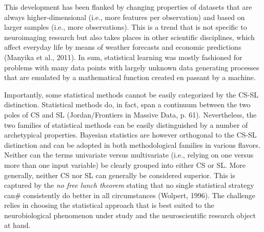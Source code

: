 \documentclass[authoryear,review,3p]{elsarticle}
\begin{document}
This development has been flanked by changing properties of datasets that
are always higher-dimensional (i.e., more features per observation)
and
based
on larger samples (i.e., more observations).
This is a trend that is not specific to
neuroimaging research but also takes places
in other scientific disciplines,
which affect everyday life by means of weather forecasts and economic predictions
(Manyika et al., 2011).
In sum,
statistical learning was mostly fashioned
for problems with many data points with largely unknown
data generating processes
that are emulated by a mathematical function
created en passant by a machine.


Importantly, some statistical
methods cannot be easily categorized by the CS-SL distinction.
Statistical methods do, in fact, span a continuum between the two poles of CS and SL
(Jordan/Frontiers in Massive Data, p. 61).
Nevertheless, the two families of statistical methods
can be easily distinguished by a number of archetypical properties.
Bayesian statistics are however orthogonal to the CS-SL distinction
and can be adopted in both methodological families in various flavors.
%
Neither can the terms univariate versus multivariate
(i.e., relying on one versus more than one input variable)
be clearly grouped into either CS or SL.
%
More generally,
neither CS nor SL can generally be considered superior.
This is captured by the \textit{no free lunch theorem}
stating that no single statistical strategy can#
consistently do better in all circumstances (Wolpert, 1996).
The challenge relies in choosing
the statistical approach that is best suited
to the neurobiological phenomenon under study and the neuroscientific research object at hand.
\end{document}

